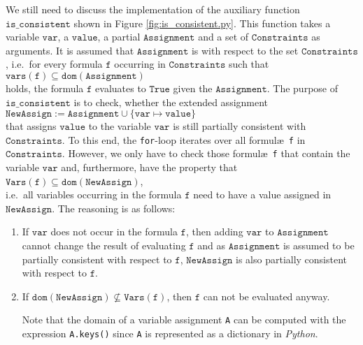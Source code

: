 We still need to discuss the implementation of the auxiliary function $\texttt{is\_consistent}$
shown in Figure \ref{fig:is_consistent.py}.  This function takes a variable $\texttt{var}$, a $\texttt{value}$, a partial 
$\texttt{Assignment}$ and a set of $\texttt{Constraints}$ as arguments.  It is assumed that $\texttt{Assignment}$ is
 with respect to the set $\texttt{Constraints}$, i.e.~for every formula $\texttt{f}$
occurring in $\texttt{Constraints}$ such that
\\[0.2cm]
\hspace*{1.3cm}
$\texttt{vars}(\texttt{f}) \subseteq \texttt{dom}(\texttt{Assignment})$
\\[0.2cm]
holds, the formula $\texttt{f}$ evaluates to $\texttt{True}$ given the $\texttt{Assignment}$.  The purpose of
$\texttt{is\_consistent}$ is to check, whether the extended assignment
\\[0.2cm]
\hspace*{1.3cm}
$\texttt{NewAssign} \;\texttt{:=}\;\texttt{Assignment} \cup \{ \texttt{var} \mapsto \texttt{value} \}$
\\[0.2cm]
that assigns $\texttt{value}$ to the variable $\texttt{var}$ is still partially consistent with $\texttt{Constraints}$. 
To this end, the \texttt{for}-loop iterates over all formul\ae\ \texttt{f} in $\texttt{Constraints}$. 
However, we only have to check those formul\ae\ \texttt{f} that contain the variable $\texttt{var}$ and,
furthermore, have the property that
\\[0.2cm]
\hspace*{1.3cm}
$\texttt{Vars}(\texttt{f}) \subseteq \texttt{dom}(\texttt{NewAssign})$,
\\[0.2cm]
i.e.~all variables occurring in the formula $\texttt{f}$ need to have a value assigned in
$\texttt{NewAssign}$.  The reasoning is as follows:
\begin{enumerate}
\item If $\texttt{var}$ does not occur in the formula $\texttt{f}$, then adding $\texttt{var}$ to
      $\texttt{Assignment}$ cannot change the result of evaluating $\texttt{f}$ and as
      $\texttt{Assignment}$ is assumed to be partially consistent with respect to $\texttt{f}$, 
      $\texttt{NewAssign}$ is also partially consistent with respect to $\texttt{f}$.
\item If $\texttt{dom}(\texttt{NewAssign}) \not\subseteq \texttt{Vars}(\texttt{f})$, then $\texttt{f}$ can not
      be evaluated anyway. 

      Note that the domain of a variable assignment \texttt{A} can be computed with the expression 
      \texttt{A.keys()} since \texttt{A} is represented as a dictionary in \textsl{Python}.
\end{enumerate}

